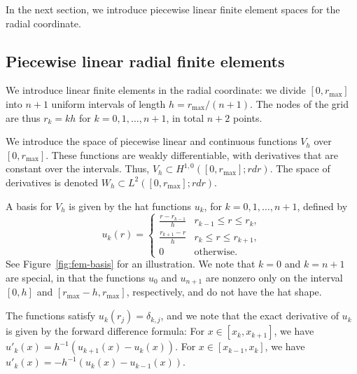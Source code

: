 \documentclass[12pt]{article}
\begin{document}
In the next section, we introduce piecewise linear finite element spaces for the radial coordinate.



\subsection{Piecewise linear radial finite elements}

We introduce linear finite elements in the radial coordinate: we  divide $[0, r_\text{max}]$ into $n+1$ uniform intervals of length $h = r_\text{max}/(n+1)$. The nodes of the grid are thus $r_k = kh$ for $k=0,1,\ldots,n+1$, in total $n+2$ points. 


We introduce the space of piecewise linear and continuous functions $V_h$ over $[0, r_\text{max}]$. These functions are weakly differentiable, with derivatives that are constant over the intervals. Thus, $V_h \subset H^{1,0}([0,r_\text{max}];r dr)$. The space of derivatives is denoted $W_h \subset L^2([0,r_\text{max}]; r dr)$.

A basis for $V_h$ is given by the hat functions $u_k$, for $k=0,1,\ldots,n+1$, defined by
\begin{equation}
    u_k(r) = \begin{cases}
        \frac{r-r_{k-1}}{h} & r_{k-1} \leq r \leq r_k, \\
        \frac{r_{k+1}-r}{h} & r_k \leq r \leq r_{k+1}, \\
        0 & \text{otherwise}.
    \end{cases}
\end{equation}
See Figure~\ref{fig:fem-basis} for an illustration.
We note that $k=0$ and $k=n+1$ are special, in that the functions $u_0$ and $u_{n+1}$ are nonzero only on the interval $[0,h]$ and $[r_\text{max}-h,r_\text{max}]$, respectively, and do not have the hat shape.


The functions satisfy $u_k(r_j) = \delta_{k,j}$, and we note that the exact derivative of $u_k$ is given by the forward difference formula: For $x \in [x_k, x_{k+1}]$, we have $u'_k(x) = h^{-1} (u_{k+1}(x) - u_k(x))$. For $x \in [x_{k-1}, x_k]$, we have $u'_k(x) = -h^{-1} (u_{k}(x) - u_{k-1}(x))$.
\end{document}
